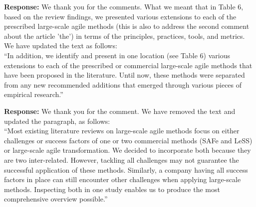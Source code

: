 \documentclass[a4paper,twoside,11pt]{reviewresponse}
\begin{document}
\textbf{Response:}
We thank you for the comments. What we meant that in Table 6, based on the review findings, we presented various extensions to each of the prescribed large-scale agile methods (this is also to address the second comment about the article 'the') in terms of the principles, practices, tools, and metrics. We have updated the text as follows: \\
``In addition, we identify and present in one location (see Table 6) various extensions to each of the prescribed or commercial large-scale agile methods that have been proposed in the literature. Until now, these methods were separated from any new recommended additions that emerged through various pieces of empirical research.''


\textbf{Response:}
We thank you for the comment. We have removed the text and updated the paragraph, as follows:\\
``Most existing literature reviews on large-scale agile methods focus on either challenges or success factors of one or two commercial methods (SAFe and LeSS) or large-scale agile transformation. We decided to incorporate both because they are two inter-related. However, tackling all challenges may not guarantee the successful application of these methods. Similarly, a company having all success factors in place can still encounter other challenges when applying large-scale methods. Inspecting both in one study enables us to produce the most comprehensive overview possible.''
\end{document}
